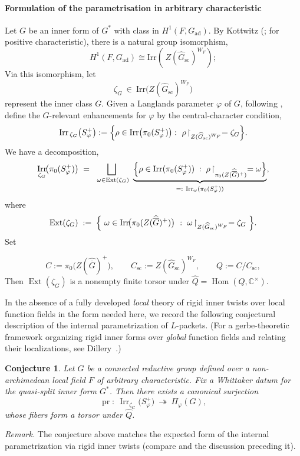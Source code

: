 \documentclass[american]{article}
\numberwithin{equation}{section}
\numberwithin{figure}{section}
\theoremstyle{plain}
\newtheorem{conjecture}[theorem]{Conjecture}
\theoremstyle{definition}
\theoremstyle{remark}
\DeclareMathOperator{\Hom}{Hom}
\DeclareMathOperator{\Irr}{Irr}
\DeclareMathOperator{\Ext}{Ext}
\newcommand{\C}{\mathbb{C}}
\begin{document}
\paragraph{Formulation of the parametrisation in arbitrary characteristic}
Let $G$ be an inner form of $G^{\ast}$ with class in $H^{1}(F,G_{\mathrm{ad}})$. By Kottwitz (\cite[Proposition 6.4]{Kott84}; \cite[Theorem 2.1]{Thang11} for positive characteristic), there is a natural group isomorphism,
\[
  H^{1}(F,G_{\mathrm{ad}})\cong \mathrm{Irr}(\,Z(\widehat{G}_{\mathrm{sc}})^{W_F});
\]
Via this isomorphism, let 
\[
  \zeta_{G}\ \in\ \mathrm{Irr}\big(Z(\widehat G_{\mathrm{sc}})^{W_F}\big)
\]
represent the inner class $G$. Given a Langlands parameter \(\varphi\) of \(G\), following \cite{ABPS18}, define the $G$-relevant enhancements for $\varphi$ by the central-character condition,
\[
  \mathrm{Irr}_{\,\zeta_G}\bigl(S_\varphi^{+}\bigr):=\Bigl\{\rho\in\mathrm{Irr}\bigl(\pi_0(S_\varphi^{+})\bigr):\ 
  \rho\!\restriction_{Z(\widehat G_{\mathrm{sc}})^{W_F}}=\zeta_G\Bigr\}.
\]
We have a decomposition,
\[
\Irr_{\zeta_G}\!\bigl(\pi_0(S_\varphi^{+})\bigr)
\;=\;
\bigsqcup_{\ \omega\in\Ext(\zeta_G)}\ 
\underbrace{\Bigl\{\rho\in\Irr(\pi_0(S_\varphi^{+}))\;:\;
\rho\!\restriction_{\pi_0(Z(\widehat{\overline G})^{+})}=\omega\Bigr\}}_{=:~\Irr_\omega(\pi_0(S_\varphi^{+}))},
\]
where
\[
\Ext(\zeta_G)\;:=\;\Bigl\{\ \omega\in\Irr\!\bigl(\pi_0(Z(\widehat{\overline G})^{+})\bigr)\ :\
\omega\!\restriction_{Z(\widehat G_{\mathrm{sc}})^{W_F}}=\zeta_G\ \Bigr\}.
\]
Set

$$
C:=\pi_0\!\bigl(Z(\widehat{\overline G})^{+}\bigr),\qquad
C_{\mathrm{sc}}:=Z(\widehat G_{\mathrm{sc}})^{W_F},\qquad
Q:=C/C_{\mathrm{sc}},
$$
Then $\Ext(\zeta_G)$ is a nonempty finite torsor under $\widehat Q=\Hom(Q,\C^\times)$.

\medskip
In the absence of a fully developed \emph{local} theory of rigid inner twists over
local function fields in the form needed here, we record the following conjectural
description of the internal parametrization of $L$-packets.
(For a gerbe-theoretic framework organizing rigid inner forms over \emph{global}
function fields and relating their localizations, see Dillery~\cite{Dillery}.)

\begin{conjecture}
Let \(G\) be a connected reductive group defined over a non-archimedean local field \(F\) of arbitrary characteristic. Fix a Whittaker datum for the quasi-split inner form $G^{\ast}$. Then there exists a canonical surjection
\[
\operatorname{pr}:\ \Irr_{\zeta_G}\!\bigl(S_\varphi^{+}\bigr)\ \twoheadrightarrow\ \Pi_{\varphi}(G),
\]
whose fibers form a torsor under \(\widehat{Q}\). 
\end{conjecture}
\noindent\textit{Remark.}
The conjecture above matches the expected form of the internal parametrization via
rigid inner twists (compare \cite[Conj.~1.1]{Dillery} and the discussion preceding it).
\end{document}
